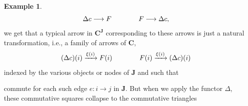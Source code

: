 \documentclass[11pt]{book}
\theoremstyle{definition}
\newtheorem{example}{Example}[section]
\theoremstyle{definition}
\theoremstyle{definition}
\theoremstyle{theorem}
\theoremstyle{definition}
\begin{document}
\begin{example}
	\begin{equation*}
	\Delta c \longrightarrow F \hspace*{4em} F \longrightarrow \Delta c,  
	\end{equation*}
	we get that a typical arrow in $\textbf{C}^{\textbf{J}}$ corresponding to these arrows is just a natural transformation, i.e., a family of arrows of $\textbf{C}$, 
	\begin{equation*}
	(\Delta c)(i) \xrightarrow{\xi(i)} F(i) \hspace*{4em} F(i) \xrightarrow{\xi (i)} (\Delta c)(i)  
	\end{equation*}
	indexed by the various objects or nodes of $\textbf{J}$ and such that 
	\begin{center} 
	\end{center} \par \noindent 
	commute for each such edge $e: i \rightarrow j$ in \textbf{J}. But when we apply the functor $\Delta$, these commutative squares collapse to the commutative triangles
	\begin{center} 
	\end{center} \par \noindent 

\end{example}
\end{document}
